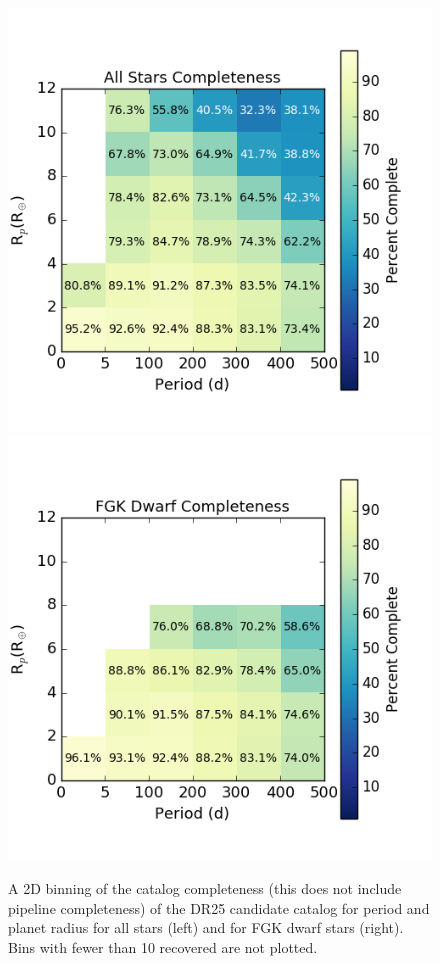 \begin{figure}[h!]
\begin{center}
\includegraphics[width=0.45\linewidth]{fig-AllCompletePR.png}
\includegraphics[width=0.45\linewidth]{fig-FgkCompletePR.png}
\caption{A 2D binning of the catalog completeness (this does not include pipeline completeness) of the DR25 candidate catalog for period and planet radius for all stars (left) and for FGK dwarf stars (right). Bins with fewer than 10 recovered  are not plotted.}
\label{f:prCompleteness}
\end{center}
\end{figure}

